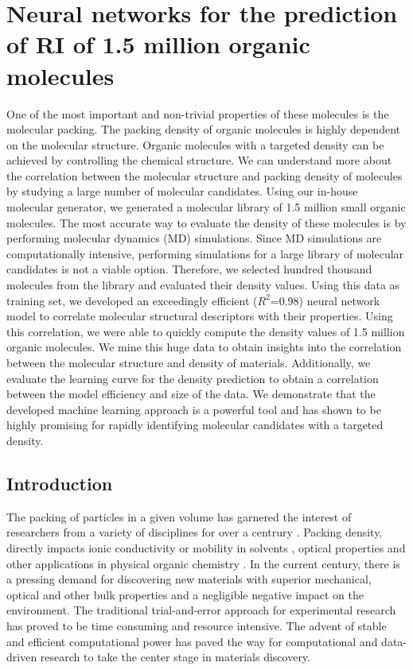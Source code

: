 \chapter{Neural networks for the prediction of RI of 1.5 million organic molecules}

 One of the most important and non-trivial properties of these molecules is the molecular packing. The packing density of organic molecules is highly dependent on the molecular structure. Organic molecules with a targeted density can be achieved by controlling the chemical structure. We can understand more about the correlation between the molecular structure and packing density of molecules by studying a large number of molecular candidates. Using our in-house molecular generator, we generated a molecular library of 1.5 million small organic molecules. The most accurate way to evaluate the density of these molecules is by performing molecular dynamics (MD) simulations. Since MD simulations are computationally intensive, performing simulations for a large library of molecular candidates is not a viable option. Therefore, we selected hundred thousand molecules from the library and evaluated their density values. Using this data as training set, we developed an exceedingly efficient ($R^2$=0.98) neural network model to correlate molecular structural descriptors with their properties. Using this correlation, we were able to quickly compute the density values of 1.5 million organic molecules. We mine this huge data to obtain insights into the correlation between the molecular structure and density of materials. Additionally, we evaluate the learning curve for the density prediction to obtain a correlation between the model efficiency and size of the data. We demonstrate that the developed machine learning approach is a powerful tool and has shown to be highly promising for rapidly identifying molecular candidates with a targeted density. 
 


\section{Introduction}
\label{sec:introduction}

The packing of particles in a given volume has garnered the interest of researchers from a variety of disciplines for over a centrury \cite{Kwan2009}. Packing density, directly impacts ionic conductivity \cite{Swenson1996} or mobility in solvents \cite{Shen2015}, optical properties \cite{Ando2006}\cite{Terui2004} and other applications in physical organic chemistry \cite{Sheu1989}. In the current century, there is a pressing demand for discovering new materials with superior mechanical, optical and other bulk properties and a negligible negative impact on the environment. The traditional trial-and-error approach for experimental research has proved to be time consuming and resource intensive. The advent of stable and efficient computational power has paved the way for computational and data-driven research to take the center stage in materials discovery. 

